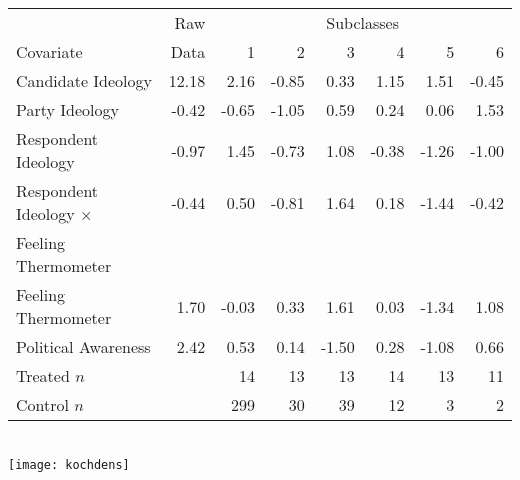 \documentclass[20pt,landscape,pdftex]{foils}
\newcommand{\MC}{\multicolumn}
\begin{document}
\begin{center}
    \begin{tabular}{lrrrrrrr}
      \hline
      & Raw  &\MC{6}{c}{ Subclasses} \\
      Covariate & Data  & 1 &  2 &  3 &  4 &  5 &  6 \\
      \hline
      Candidate Ideology & 12.18 & 2.16 & -0.85 & 0.33 & 1.15 & 1.51 & -0.45 \\
      Party Ideology & -0.42 & -0.65 & -1.05 & 0.59 & 0.24 & 0.06 & 1.53 \\
      Respondent Ideology & -0.97 & 1.45 & -0.73 & 1.08 & -0.38 & -1.26 & -1.00 \\
      Respondent Ideology $\times$ & -0.44 & 0.50 & -0.81 & 1.64 & 0.18 &
      -1.44 & -0.42 \\
      \hspace{0.1in} Feeling Thermometer \\
      Feeling Thermometer & 1.70 & -0.03 & 0.33 & 1.61 & 0.03 & -1.34 & 1.08 \\
      Political Awareness & 2.42 & 0.53 & 0.14 & -1.50 & 0.28 & -1.08 & 0.66
      \\ \hline
      Treated $n$& & 14 & 13 & 13 & 14 & 13 & 11 \\
      Control $n$& & 299 & 30 & 39 & 12 & 3 & 2 \\
      \hline
    \end{tabular} \\
  \texttt{[image: kochdens]}\pause
\end{center}
\end{document}

